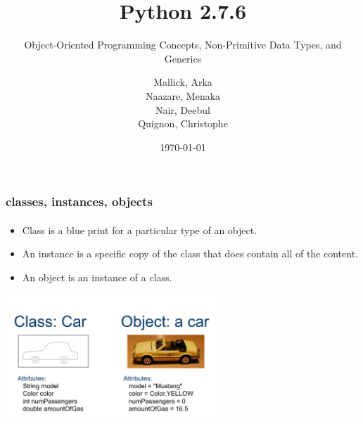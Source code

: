 \documentclass{beamer}
\begin{document}
\title{Python 2.7.6}
\subtitle{Object-Oriented Programming Concepts, Non-Primitive Data Types, and Generics}
\author{
  Mallick, Arka\\
  Naazare, Menaka \\
  Nair, Deebul\\
  Quignon, Christophe \\
} 
\date{\today}

\begin{frame}
\titlepage
\end{frame}

\begin{frame}[fragile]
\frametitle{classes, instances, objects}
\framesubtitle{}

\begin{itemize}
	\item Class is a blue print for a particular type of an object.
	\item An instance is a specific copy of the class that does contain all of the content. 
\item An object is an instance of a class.
\end{itemize}

\includegraphics[width= 8cm]{1.png}
\end{frame}
\end{document}
